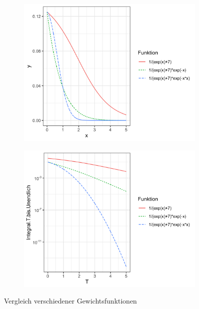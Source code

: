 \documentclass[12pt,a4paper]{scrartcl}
\numberwithin{equation}{section}
\numberwithin{myalgctr}{section}
\numberwithin{mytheoremctr}{subsection}
\numberwithin{mykorollarctr}{subsection}
\numberwithin{mylemmactr}{subsection}
\numberwithin{mybeispielctr}{subsection}
\begin{document}
	
	\begin{figure}[H]
		\begin{subfigure}[t]{0.5\textwidth}
			
			\includegraphics[width=\linewidth]{../plots/aufgabe-e-vergleich.png}
			\label{fig:f-vergleich}
			
		\end{subfigure}
		\begin{subfigure}[t]{0.5\textwidth}
			\includegraphics[width=\linewidth]{../plots/aufgabe-e-vergleich-integral.png}
			\label{fig:f-vergleich-int}
		\end{subfigure}
		\caption{Vergleich verschiedener Gewichtsfunktionen}
	\end{figure}
\end{document}
